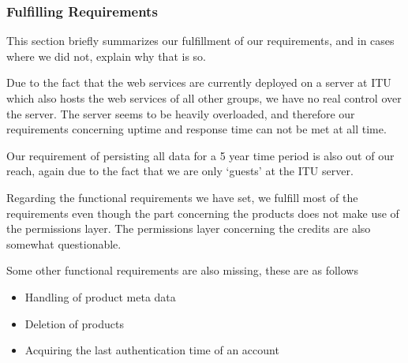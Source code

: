 \subsubsection{Fulfilling Requirements}
\label{serverfulfil}
This section briefly summarizes our fulfillment of our requirements, and in cases where we did not, explain why that is so.

Due to the fact that the web services are currently deployed on a server at ITU which also hosts the web services of all other groups, we have no real control over the server. The server seems to be heavily overloaded, and therefore our requirements concerning uptime and response time can not be met at all time.

Our requirement of persisting all data for a 5 year time period is also out of our reach, again due to the fact that we are only `guests' at the ITU server.

Regarding the functional requirements we have set, we fulfill most of the requirements even though the part concerning the products does not make use of the permissions layer. The permissions layer concerning the credits are also somewhat questionable.

Some other functional requirements are also missing, these are as follows
\begin{itemize}
\item Handling of product meta data
\item Deletion of products
\item Acquiring the last authentication time of an account
\end{itemize}

